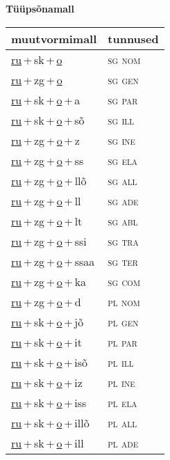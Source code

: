 
\vspace{1.8em}
\begin{minipage}{\textwidth}
\textbf{Tüüpsõnamall \,}\\

\begin{sideways}
\begin{tabular}{l l}
muutvormimall & tunnused \\
\hline
\underline{ru}\,+\,sk\,+\,\underline{o} & \textsc{ sg nom } \\
\underline{ru}\,+\,zg\,+\,\underline{o} & \textsc{ sg gen } \\
\underline{ru}\,+\,sk\,+\,\underline{o}\,+\,a & \textsc{ sg par } \\
\underline{ru}\,+\,sk\,+\,\underline{o}\,+\,sõ & \textsc{ sg ill } \\
\underline{ru}\,+\,zg\,+\,\underline{o}\,+\,z & \textsc{ sg ine } \\
\underline{ru}\,+\,zg\,+\,\underline{o}\,+\,ss & \textsc{ sg ela } \\
\underline{ru}\,+\,zg\,+\,\underline{o}\,+\,llõ & \textsc{ sg all } \\
\underline{ru}\,+\,zg\,+\,\underline{o}\,+\,ll & \textsc{ sg ade } \\
\underline{ru}\,+\,zg\,+\,\underline{o}\,+\,lt & \textsc{ sg abl } \\
\underline{ru}\,+\,zg\,+\,\underline{o}\,+\,ssi & \textsc{ sg tra } \\
\underline{ru}\,+\,zg\,+\,\underline{o}\,+\,ssaa & \textsc{ sg ter } \\
\underline{ru}\,+\,zg\,+\,\underline{o}\,+\,ka & \textsc{ sg com } \\
\underline{ru}\,+\,zg\,+\,\underline{o}\,+\,d & \textsc{ pl nom } \\
\underline{ru}\,+\,sk\,+\,\underline{o}\,+\,jõ & \textsc{ pl gen } \\
\underline{ru}\,+\,sk\,+\,\underline{o}\,+\,it & \textsc{ pl par } \\
\underline{ru}\,+\,sk\,+\,\underline{o}\,+\,isõ & \textsc{ pl ill } \\
\underline{ru}\,+\,sk\,+\,\underline{o}\,+\,iz & \textsc{ pl ine } \\
\underline{ru}\,+\,sk\,+\,\underline{o}\,+\,iss & \textsc{ pl ela } \\
\underline{ru}\,+\,sk\,+\,\underline{o}\,+\,illõ & \textsc{ pl all } \\
\underline{ru}\,+\,sk\,+\,\underline{o}\,+\,ill & \textsc{ pl ade } \\

\end{tabular}
\end{sideways}
\end{minipage}
